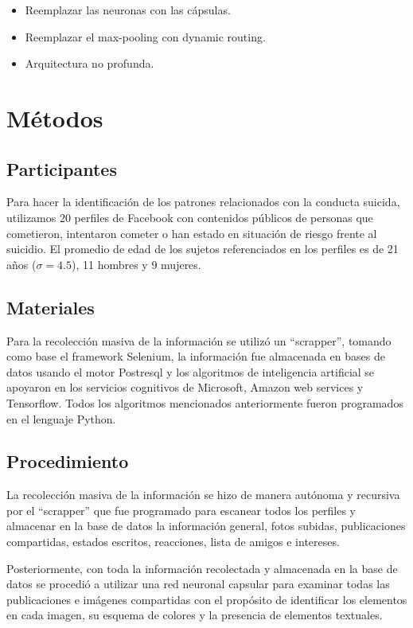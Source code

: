 \documentclass[12pt, man, donotrepeattitle, letterpaper]{apa6}
\begin{document}
    \begin{itemize}
        \item Reemplazar las neuronas con las cápsulas.
        \item Reemplazar el max-pooling con dynamic routing.
        \item Arquitectura no profunda.
    \end{itemize}
    
    \newpage
    \section{Métodos}
    \subsection{Participantes}
    Para hacer la identificación de los patrones relacionados con la conducta suicida, utilizamos 20 perfiles de Facebook con contenidos públicos de personas que cometieron, intentaron cometer o han estado en situación de riesgo frente al suicidio. El promedio de edad de los sujetos referenciados en los perfiles es de 21 años ($\sigma = 4.5$), 11 hombres y 9 mujeres.
    
    \subsection{Materiales}
    Para la recolección masiva de la información se utilizó un ``scrapper'', tomando como base el framework Selenium, la información fue almacenada en bases de datos usando el motor Postresql y los algoritmos de inteligencia artificial se apoyaron en los servicios cognitivos de Microsoft, Amazon web services y Tensorflow. Todos los algoritmos mencionados anteriormente fueron programados en el lenguaje Python.
    
    \subsection{Procedimiento}
    La recolección masiva de la información se hizo de manera autónoma y recursiva por el ``scrapper'' que fue programado para escanear todos los perfiles y almacenar en la base de datos la información general, fotos subidas, publicaciones compartidas, estados escritos, reacciones, lista de amigos e intereses.
    
    Posteriormente, con toda la información recolectada y almacenada en la base de datos se procedió a utilizar una red neuronal capsular para examinar todas las publicaciones e imágenes compartidas con el propósito de identificar los elementos en cada imagen, su esquema de colores y la presencia de elementos textuales.
    
\end{document}
